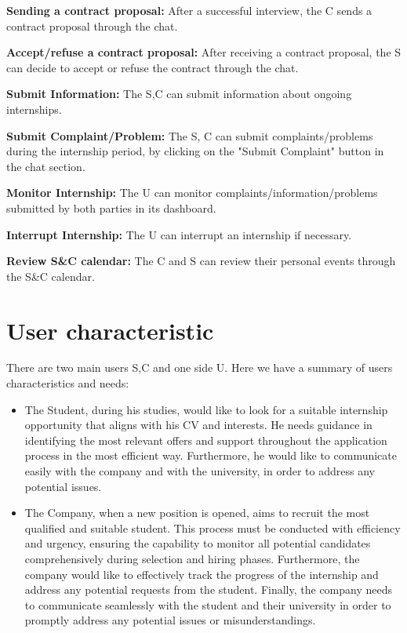 \textbf{Sending a contract proposal:} After a successful interview, the C
sends a contract proposal through the chat.

\textbf{Accept/refuse a contract proposal:} After receiving a contract
proposal, the S can decide to accept or refuse the contract through the
chat.

\textbf{Submit Information:} The S,C can submit information about
ongoing internships.

\textbf{Submit Complaint/Problem:} The S, C can submit
complaints/problems during the internship period, by clicking on the
"Submit Complaint" button in the chat section.

\textbf{Monitor Internship:} The U can monitor
complaints/information/problems submitted by both parties in its
dashboard.

\textbf{Interrupt Internship:} The U can interrupt an internship if
necessary.

\textbf{Review S\&C calendar:} The C and S can review their personal
events through the S\&C calendar.


\section{User characteristic}
\label{sec:User_characteristic}%

There are two main users S,C and one side U.
Here we have a summary of users characteristics and needs:

\begin{itemize}
\item
  The Student, during his studies, would like to look for a suitable
  internship opportunity that aligns with his CV and interests. He needs
  guidance in identifying the most relevant offers and support
  throughout the application process in the most efficient way.
  Furthermore, he would like to communicate easily with the company and
  with the university, in order to address any potential issues.
\end{itemize}

\begin{itemize}
\item
  The Company, when a new position is opened, aims to recruit the most
  qualified and suitable student. This process must be conducted with
  efficiency and urgency, ensuring the capability to monitor all
  potential candidates comprehensively during selection and hiring
  phases. Furthermore, the company would like to effectively track the
  progress of the internship and address any potential requests from the
  student. Finally, the company needs to communicate seamlessly with the
  student and their university in order to promptly address any
  potential issues or misunderstandings.
\end{itemize}

